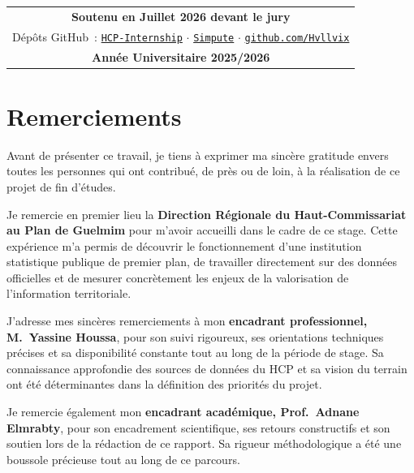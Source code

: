 \documentclass[12pt,a4paper]{report}
\begin{document}
\begin{titlepage}
\begin{center}
\begin{tabular}{@{}c@{}}
    {\sffamily\small\bfseries\color{hcpgray}
      Soutenu en Juillet 2026 devant le jury}\\[6pt]
    {\sffamily\footnotesize\color{hcpgray}
      D\'ep\^ots GitHub~:
      \href{https://github.com/Hvllvix/HCP-Internship}{\texttt{HCP-Internship}}
      \enspace$\cdot$\enspace
      \href{https://github.com/Hvllvix/Simpute}{\texttt{Simpute}}
      \enspace$\cdot$\enspace
      \href{https://github.com/Hvllvix}{\texttt{github.com/Hvllvix}}}\\[15pt]
    {\sffamily\LARGE\bfseries\color{hcpblue} Ann\'ee Universitaire 2025/2026}
  \end{tabular}
\end{center}

\end{titlepage}

\setcounter{page}{1}

\chapter*{Remerciements}

Avant de présenter ce travail, je tiens à exprimer ma sincère gratitude envers toutes les personnes qui ont contribué, de près ou de loin, à la réalisation de ce projet de fin d'études.

Je remercie en premier lieu la \textbf{Direction Régionale du Haut-Commissariat au Plan de Guelmim} pour m'avoir accueilli dans le cadre de ce stage. Cette expérience m'a permis de découvrir le fonctionnement d'une institution statistique publique de premier plan, de travailler directement sur des données officielles et de mesurer concrètement les enjeux de la valorisation de l'information territoriale.

J'adresse mes sincères remerciements à mon \textbf{encadrant professionnel, M.\ Yassine Houssa}, pour son suivi rigoureux, ses orientations techniques précises et sa disponibilité constante tout au long de la période de stage. Sa connaissance approfondie des sources de données du HCP et sa vision du terrain ont été déterminantes dans la définition des priorités du projet.

Je remercie également mon \textbf{encadrant académique, Prof.\ Adnane Elmrabty}, pour son encadrement scientifique, ses retours constructifs et son soutien lors de la rédaction de ce rapport. Sa rigueur méthodologique a été une boussole précieuse tout au long de ce parcours.
\end{document}
